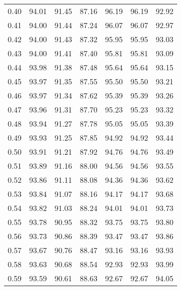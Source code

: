 \begin{tabular}{|c|c|c|c|c|c|c|}
      0.40 &     94.01 &     91.45 &      87.16 &   96.19 &      96.19 &         92.92 \\
      0.41 &     94.00 &     91.44 &      87.24 &   96.07 &      96.07 &         92.97 \\
      0.42 &     94.00 &     91.43 &      87.32 &   95.95 &      95.95 &         93.03 \\
      0.43 &     94.00 &     91.41 &      87.40 &   95.81 &      95.81 &         93.09 \\
      0.44 &     93.98 &     91.38 &      87.48 &   95.64 &      95.64 &         93.15 \\
      0.45 &     93.97 &     91.35 &      87.55 &   95.50 &      95.50 &         93.21 \\
      0.46 &     93.97 &     91.34 &      87.62 &   95.39 &      95.39 &         93.26 \\
      0.47 &     93.96 &     91.31 &      87.70 &   95.23 &      95.23 &         93.32 \\
      0.48 &     93.94 &     91.27 &      87.78 &   95.05 &      95.05 &         93.39 \\
      0.49 &     93.93 &     91.25 &      87.85 &   94.92 &      94.92 &         93.44 \\
      0.50 &     93.91 &     91.21 &      87.92 &   94.76 &      94.76 &         93.49 \\
      0.51 &     93.89 &     91.16 &      88.00 &   94.56 &      94.56 &         93.55 \\
      0.52 &     93.86 &     91.11 &      88.08 &   94.36 &      94.36 &         93.62 \\
      0.53 &     93.84 &     91.07 &      88.16 &   94.17 &      94.17 &         93.68 \\
      0.54 &     93.82 &     91.03 &      88.24 &   94.01 &      94.01 &         93.73 \\
      0.55 &     93.78 &     90.95 &      88.32 &   93.75 &      93.75 &         93.80 \\
      0.56 &     93.73 &     90.86 &      88.39 &   93.47 &      93.47 &         93.86 \\
      0.57 &     93.67 &     90.76 &      88.47 &   93.16 &      93.16 &         93.93 \\
      0.58 &     93.63 &     90.68 &      88.54 &   92.93 &      92.93 &         93.99 \\
      0.59 &     93.59 &     90.61 &      88.63 &   92.67 &      92.67 &         94.05 \\

\end{tabular}
